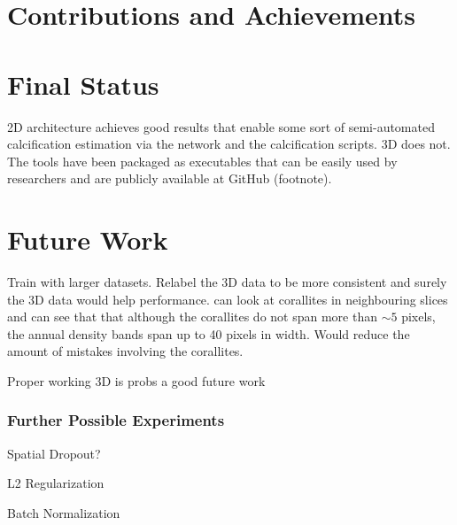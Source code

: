 \section{Contributions and Achievements}

\lipsum[1]
\lipsum[2]
\lipsum[3]

\section{Final Status}

2D architecture achieves good results that enable some sort of semi-automated calcification estimation via the network and the calcification scripts. 3D does not. The tools have been packaged as executables that can be easily used by researchers and are publicly available at GitHub (footnote). 

\lipsum[4]
\lipsum[5]

\section{Future Work}

Train with larger datasets. Relabel the 3D data to be more consistent and surely the 3D data would help performance. can look at corallites in neighbouring slices and can see that that although the corallites do not span more than ${\sim}5$ pixels, the annual density bands span up to 40 pixels in width. Would reduce the amount of mistakes involving the corallites.

Proper working 3D is probs a good future work

\lipsum[6]

\subsubsection{Further Possible Experiments}

Spatial Dropout?

L2 Regularization

Batch Normalization



